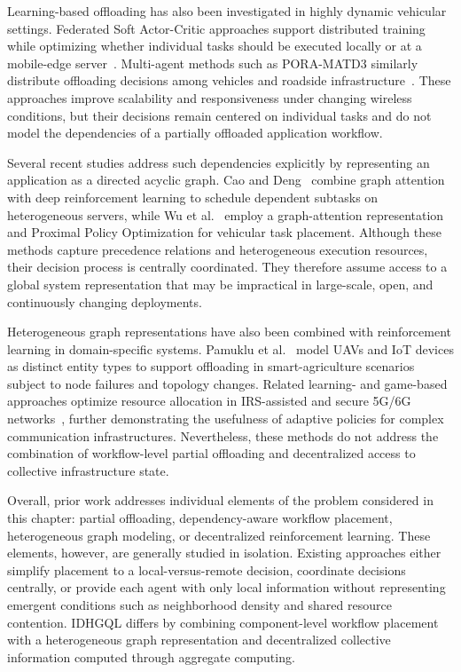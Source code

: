 Learning-based offloading has also been investigated in highly dynamic vehicular
settings.
Federated Soft Actor-Critic approaches support distributed training while
optimizing whether individual tasks should be executed locally or at a mobile-edge
server~\cite{moghaddasi2026adhoc}.
Multi-agent methods such as PORA-MATD3 similarly distribute offloading decisions
among vehicles and roadside infrastructure~\cite{Wu2025PORA}.
These approaches improve scalability and responsiveness under changing wireless
conditions, but their decisions remain centered on individual tasks and do not
model the dependencies of a partially offloaded application workflow.

Several recent studies address such dependencies explicitly by representing an
application as a directed acyclic graph.
Cao and Deng~\cite{Cao2023GATDAG} combine graph attention with deep reinforcement
learning to schedule dependent subtasks on heterogeneous servers, while Wu et
al.~\cite{Wu2025VehicularHGAT} employ a graph-attention representation and
Proximal Policy Optimization for vehicular task placement.
Although these methods capture precedence relations and heterogeneous execution
resources, their decision process is centrally coordinated.
They therefore assume access to a global system representation that may be
impractical in large-scale, open, and continuously changing deployments.

Heterogeneous graph representations have also been combined with reinforcement
learning in domain-specific systems.
Pamuklu et al.~\cite{Pamuklu2023UAVIoT} model UAVs and IoT devices as distinct
entity types to support offloading in smart-agriculture scenarios subject to node
failures and topology changes.
Related learning- and game-based approaches optimize resource allocation in
IRS-assisted and secure 5G/6G networks~\cite{chen2025tmc,chen2024jsac}, further
demonstrating the usefulness of adaptive policies for complex communication
infrastructures.
Nevertheless, these methods do not address the combination of workflow-level
partial offloading and decentralized access to collective infrastructure state.

Overall, prior work addresses individual elements of the problem considered in
this chapter: partial offloading, dependency-aware workflow placement,
heterogeneous graph modeling, or decentralized reinforcement learning.
These elements, however, are generally studied in isolation.
Existing approaches either simplify placement to a local-versus-remote decision,
coordinate decisions centrally, or provide each agent with only local information
without representing emergent conditions such as neighborhood density and shared
resource contention.
IDHGQL differs by combining component-level workflow placement with a
heterogeneous graph representation and decentralized collective information
computed through aggregate computing.

